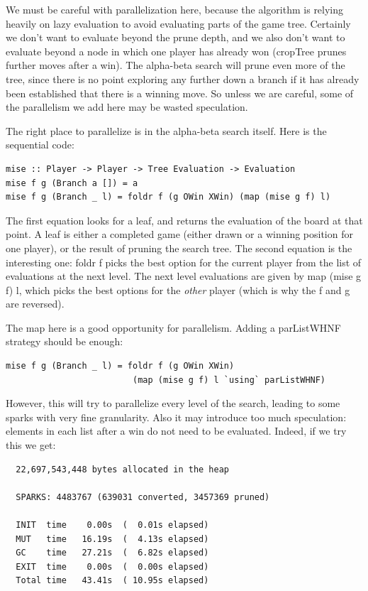 \documentclass[twocolumn,9pt]{sigplanconf}
\newcommand{\codef}[1]{{\fontfamily{cmss}\small#1}}
\begin{document}
We must be careful with parallelization here, because the algorithm is
relying heavily on lazy evaluation to avoid evaluating parts of the
game tree.  Certainly we don't want to evaluate beyond the prune
depth, and we also don't want to evaluate beyond a node in which one
player has already won (\codef{cropTree} prunes further moves after a
win).  The alpha-beta search will prune even more of the tree, since
there is no point exploring any further down a branch if it has
already been established that there is a winning move.  So unless we
are careful, some of the parallelism we add here may be wasted
speculation.

The right place to parallelize is in the alpha-beta search itself.
Here is the sequential code:

\begin{lstlisting}[columns=flexible]
mise :: Player -> Player -> Tree Evaluation -> Evaluation
mise f g (Branch a []) = a
mise f g (Branch _ l) = foldr f (g OWin XWin) (map (mise g f) l)
\end{lstlisting}

The first equation looks for a leaf, and returns the evaluation of the
board at that point.  A leaf is either a completed game (either drawn
or a winning position for one player), or the result of pruning the
search tree.  The second equation is the interesting one: \codef{foldr
  f} picks the best option for the current player from the list of
evaluations at the next level.  The next level evaluations are given
by \codef{map (mise g f) l}, which picks the best options for the
\emph{other} player (which is why the \codef{f} and \codef{g} are
reversed).

The \codef{map} here is a good opportunity for parallelism.  Adding
a \codef{parListWHNF} strategy should be enough:

\begin{lstlisting}
mise f g (Branch _ l) = foldr f (g OWin XWin) 
                         (map (mise g f) l `using` parListWHNF)
\end{lstlisting}
However, this will try to parallelize every level of the search,
leading to some sparks with very fine granularity.  Also it may
introduce too much speculation: elements in each list after a win do
not need to be evaluated.  Indeed, if we try this we get:

\begin{verbatim}
  22,697,543,448 bytes allocated in the heap

  SPARKS: 4483767 (639031 converted, 3457369 pruned)

  INIT  time    0.00s  (  0.01s elapsed)
  MUT   time   16.19s  (  4.13s elapsed)
  GC    time   27.21s  (  6.82s elapsed)
  EXIT  time    0.00s  (  0.00s elapsed)
  Total time   43.41s  ( 10.95s elapsed)
\end{verbatim}
\end{document}
